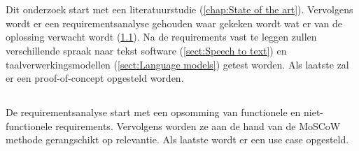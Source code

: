 
\chapter{}%
\label{ch:methodologie}



Dit onderzoek start met een literatuurstudie (\ref{chap:State of the art}). Vervolgens wordt er een requirementsanalyse gehouden waar gekeken wordt wat er van de oplossing verwacht wordt (\ref{sect:Requirements analysis}). Na de requirements vast te leggen zullen verschillende spraak naar tekst software (\ref{sect:Speech to text}) en taalverwerkingsmodellen (\ref{sect:Language models}) getest worden. Als laatste zal er een proof-of-concept opgesteld worden.

\section{} \label{sect:Requirements analysis}%

De requirementsanalyse start met een opsomming van functionele en niet-functionele requirements. Vervolgens worden ze aan de hand van de MoSCoW methode gerangschikt op relevantie. Als laatste wordt er een use case opgesteld.

\subsection{}

